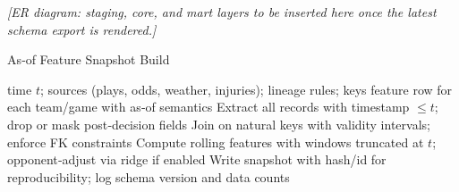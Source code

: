 \begin{center}
  \textit{[ER diagram: staging, core, and mart layers to be inserted here once the latest schema export is rendered.]}
\end{center}
\begin{algorithm}[t]
  \caption{As‑of Feature Snapshot Build}
  \label{alg:asof-snapshot}
  \begin{algorithmic}[1]
    \Require time $t$; sources (plays, odds, weather, injuries); lineage rules; keys
    \Ensure feature row for each team/game with as‑of semantics
    \State Extract all records with timestamp $\le t$; drop or mask post‑decision fields
    \State Join on natural keys with validity intervals; enforce FK constraints
    \State Compute rolling features with windows truncated at $t$; opponent‑adjust via ridge if enabled
    \State Write snapshot with hash/id for reproducibility; log schema version and data counts
  \end{algorithmic}
\end{algorithm}

